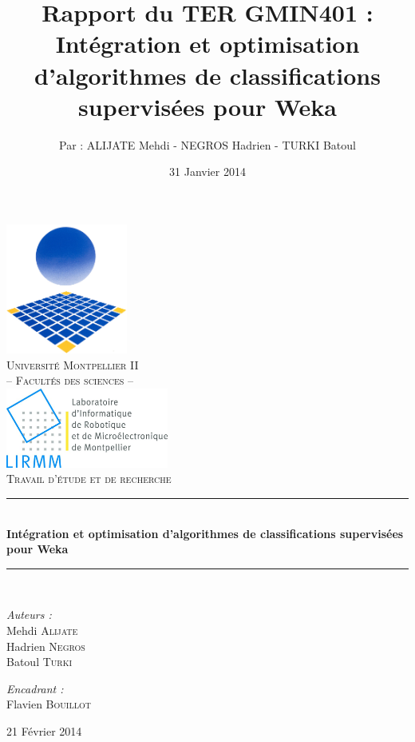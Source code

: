 \documentclass{article}
\title{Rapport du TER GMIN401 :\\ \textbf{Intégration et optimisation d’algorithmes de classifications supervisées pour Weka}}
\author{Par : ALIJATE Mehdi - NEGROS Hadrien - TURKI Batoul}
\date{31 Janvier 2014}
\newcommand{\HRule}{\rule{\linewidth}{0.5mm}}
\begin{document}
\begin{titlepage}

  \begin{center}

    \includegraphics[width=0.30\textwidth]{logo_um2}~\\[1cm]    

    \textsc{\LARGE Université Montpellier II \\ -- Facultés des sciences --}\\[1.5cm]
       
    \includegraphics[width=0.40\textwidth]{lirmm}~\\[1cm]    
    \textsc{\huge Travail d'étude et de recherche}\\[0.5cm]

    \HRule \\[0.4cm]
    { \huge \bfseries Intégration et optimisation d’algorithmes de classifications supervisées pour Weka}\\[0.4cm]
    \HRule \\[1.5cm]

    \begin{minipage}{0.4\textwidth}
      \begin{flushleft} \large
        \emph{Auteurs :}\\
        Mehdi \textsc{Alijate} \\
        Hadrien \textsc{Negros} \\
        Batoul \textsc{Turki} \\   
      \end{flushleft}
    \end{minipage}
    \begin{minipage}{0.4\textwidth}
      \begin{flushright} \large
        \emph{Encadrant :} \\
        Flavien \textsc{Bouillot} \\
      \end{flushright}
    \end{minipage}
    \vfill

    {\large 21 Février 2014}

  \end{center}

\end{titlepage}
\tableofcontents
\end{document}

